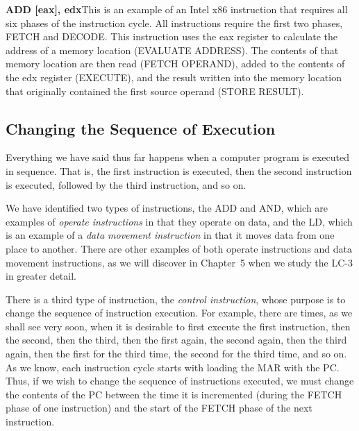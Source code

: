 \documentclass{patt}
\begin{document}

\begin{example}
  {\sffamily\footnotesize\bfseries\normalsize ADD [eax], edx\quad}This is
    an example of an Intel x86 instruction that requires all six
    phases of the instruction cycle.  All instructions require the
    first two phases, FETCH and DECODE.  This instruction uses the eax
    register to calculate the address of a memory location (EVALUATE
    ADDRESS).  The contents of that memory location are then read
    (FETCH OPERAND), added to the contents of the edx register
    (EXECUTE), and the result written into the memory location that
    originally contained the first source operand (STORE RESULT).
\end{example}
\endgroup

\vspace{-12pt}

\subsection{Changing the Sequence of Execution}
Everything we have said thus far happens when a computer program is executed 
in sequence.  That is, the first instruction is executed, then the second 
instruction is executed, followed by the third instruction, and so on.

We have identified two types of instructions, the ADD and AND, which are
examples of {\em operate instructions} in that they operate on data, and
the LD, which is an example of a {\em data movement instruction} in that 
it moves data from one place to another.
There are other examples of both operate instructions and data movement 
instructions, as we will discover in Chapter~5 when we study the LC-3 in 
greater detail.

There is a third type of instruction, the {\em control instruction}, whose
purpose is to change  the sequence of instruction
execution.  For example, there are times, as we shall see very soon, when it 
is desirable
to first execute the first instruction, then the second, then the third, then
the first again, the second again, then the third again, then the first for
the third time, the second for the third time, and so on.  As we
know, each instruction cycle starts with loading the MAR with the PC.  Thus, if we wish to change
the sequence of instructions executed, we must change the contents of the PC 
between the time
it is incremented (during the FETCH phase of one instruction) and the start of
the FETCH phase of the next instruction.
\end{document}
